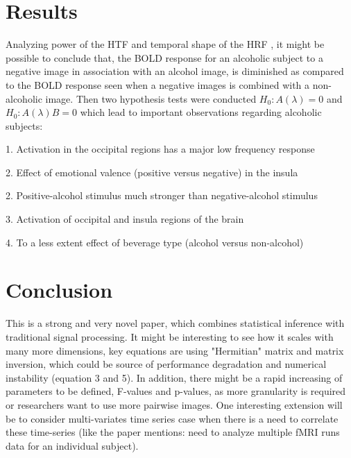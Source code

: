 \documentclass[12pt,twoside]{article}
\begin{document}
\section*{Results}
Analyzing power of the HTF and temporal shape of the HRF , it might be possible to conclude that, the BOLD response  for an alcoholic subject to a negative image in association with an alcohol image, is diminished as compared to the BOLD response seen when a negative images is combined with a non-alcoholic image. Then two hypothesis tests were conducted $H_0: A(\lambda) = 0$ and $H_0: A(\lambda) B = 0$ which lead to important observations regarding alcoholic subjects:
\be
	\item [1.] Activation in the occipital regions has a major low frequency response
	\item [2.] Effect of emotional valence (positive versus negative) in the insula
	\item [2.] Positive-alcohol stimulus much stronger than negative-alcohol stimulus
	\item [3.]  Activation of occipital and insula regions of the brain
	\item [4.] To a less extent effect of beverage type (alcohol versus non-alcohol)
\ee 

\section*{Conclusion}
This is a strong and very novel paper, which combines statistical inference with traditional signal processing. It might be interesting to see how it scales with many more dimensions,  key equations are using "Hermitian" matrix and   matrix inversion, which could be source of performance degradation and numerical instability (equation 3 and 5). In addition, there might be a rapid increasing of parameters to be defined, F-values and p-values, as more granularity is required or  researchers want to use more  pairwise images. One interesting extension will be to consider multi-variates time series case when there is a need to correlate these time-series (like the paper mentions: need to analyze multiple fMRI runs data for an individual subject). 
\end{document}
